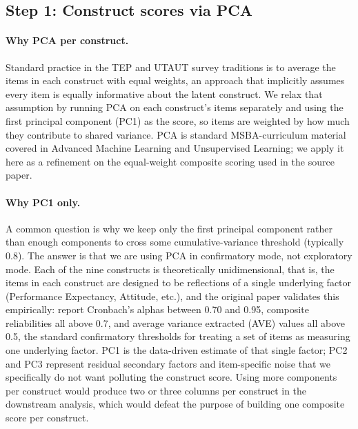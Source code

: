 \documentclass[11pt]{article}
\begin{document}
\subsection{Step 1: Construct scores via PCA}
\label{sec:pca}

\paragraph{Why PCA per construct.} Standard practice in the TEP and
UTAUT survey traditions is to average the items in each construct
with equal weights, an approach that implicitly assumes every item
is equally informative about the latent construct. We relax that
assumption by running PCA on each construct's items separately and
using the first principal component (PC1) as the score, so items
are weighted by how much they contribute to shared variance. PCA
is standard MSBA-curriculum material covered in Advanced Machine
Learning and Unsupervised Learning; we apply it here as a refinement
on the equal-weight composite scoring used in the source paper.

\paragraph{Why PC1 only.} A common question is why we keep only the
first principal component rather than enough components to cross
some cumulative-variance threshold (typically 0.8). The answer is
that we are using PCA in confirmatory mode, not exploratory mode.
Each of the nine constructs is theoretically unidimensional, that
is, the items in each construct are designed to be reflections of
a single underlying factor (Performance Expectancy, Attitude, etc.),
and the original paper validates this empirically: \citet{dadra2024tep}
report Cronbach's alphas between 0.70 and 0.95, composite reliabilities
all above 0.7, and average variance extracted (AVE) values all above
0.5, the standard confirmatory thresholds for treating a set of
items as measuring one underlying factor. PC1 is the data-driven
estimate of that single factor; PC2 and PC3 represent residual
secondary factors and item-specific noise that we specifically do
not want polluting the construct score. Using more components per
construct would produce two or three columns per construct in the
downstream analysis, which would defeat the purpose of building one
composite score per construct.
\end{document}
